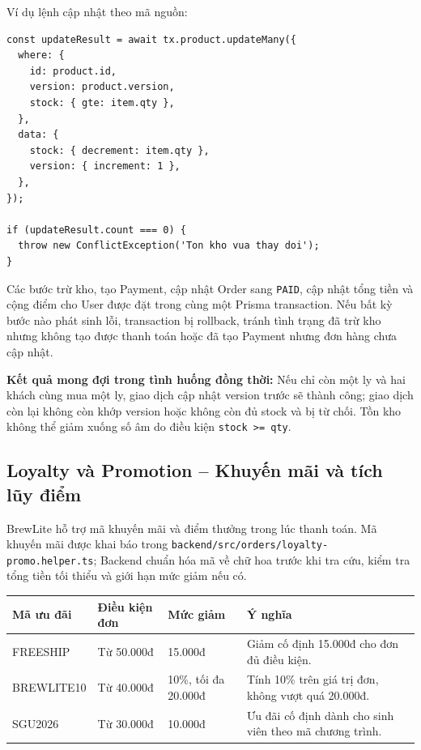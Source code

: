 Ví dụ lệnh cập nhật theo mã nguồn:
\begin{verbatim}
const updateResult = await tx.product.updateMany({
  where: {
    id: product.id,
    version: product.version,
    stock: { gte: item.qty },
  },
  data: {
    stock: { decrement: item.qty },
    version: { increment: 1 },
  },
});

if (updateResult.count === 0) {
  throw new ConflictException('Ton kho vua thay doi');
}
\end{verbatim}

Các bước trừ kho, tạo Payment, cập nhật Order sang \texttt{PAID}, cập nhật tổng tiền và cộng điểm cho User được đặt trong cùng một Prisma transaction. Nếu bất kỳ bước nào phát sinh lỗi, transaction bị rollback, tránh tình trạng đã trừ kho nhưng không tạo được thanh toán hoặc đã tạo Payment nhưng đơn hàng chưa cập nhật.

\textbf{Kết quả mong đợi trong tình huống đồng thời:} Nếu chỉ còn một ly và hai khách cùng mua một ly, giao dịch cập nhật version trước sẽ thành công; giao dịch còn lại không còn khớp version hoặc không còn đủ stock và bị từ chối. Tồn kho không thể giảm xuống số âm do điều kiện \texttt{stock >= qty}.

\subsection{Loyalty và Promotion -- Khuyến mãi và tích lũy điểm}

BrewLite hỗ trợ mã khuyến mãi và điểm thưởng trong lúc thanh toán. Mã khuyến mãi được khai báo trong \texttt{backend/src/orders/loyalty-promo.helper.ts}; Backend chuẩn hóa mã về chữ hoa trước khi tra cứu, kiểm tra tổng tiền tối thiểu và giới hạn mức giảm nếu có.

\begin{center}
\renewcommand{\arraystretch}{1.2}
\begin{tabular}{|p{2.4cm}|p{3.0cm}|p{3.0cm}|p{5.1cm}|}
\hline
\textbf{Mã ưu đãi} & \textbf{Điều kiện đơn} & \textbf{Mức giảm} & \textbf{Ý nghĩa} \\
\hline
FREESHIP & Từ 50.000đ & 15.000đ & Giảm cố định 15.000đ cho đơn đủ điều kiện. \\
\hline
BREWLITE10 & Từ 40.000đ & 10\%, tối đa 20.000đ & Tính 10\% trên giá trị đơn, không vượt quá 20.000đ. \\
\hline
SGU2026 & Từ 30.000đ & 10.000đ & Ưu đãi cố định dành cho sinh viên theo mã chương trình. \\
\hline
\end{tabular}
\end{center}

